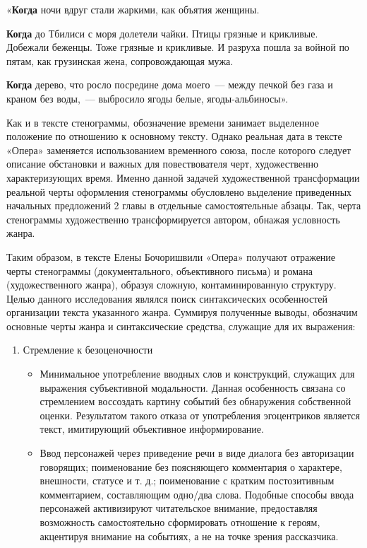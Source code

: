 \documentclass{kursa4}
\begin{document}
{        «\textbf{Когда} ночи вдруг стали жаркими, как объятия женщины.

        \textbf{Когда} до Тбилиси с моря долетели чайки. Птицы грязные и
        крикливые. Добежали беженцы. Тоже грязные и крикливые. И разруха пошла
        за войной по пятам, как грузинская жена, сопровождающая мужа.

        \textbf{Когда} дерево, что росло посредине дома моего~--- между печкой
        без газа и краном без воды,~--- выбросило ягоды белые, ягоды-альбиносы».

        Как и в тексте стенограммы, обозначение времени занимает выделенное
        положение по отношению к основному тексту. Однако реальная дата в
        тексте «Опера» заменяется использованием временного союза, после
        которого следует описание обстановки и важных для повествователя черт,
        художественно характеризующих время. Именно данной задачей
        художественной трансформации реальной черты оформления стенограммы
        обусловлено выделение приведенных начальных предложений 2 главы в
        отдельные самостоятельные абзацы. Так, черта стенограммы художественно
        трансформируется автором, обнажая условность жанра. 

  Таким образом, в тексте Елены Бочоришвили «Опера» получают отражение черты стенограммы (документального, объективного письма) и романа (художественного жанра), образуя сложную, контаминированную структуру. Целью данного исследования являлся поиск синтаксических особенностей организации текста указанного жанра. Суммируя полученные выводы, обозначим основные черты жанра и синтаксические средства, служащие для их выражения:  

  \begin{enumerate}
    \item{Стремление к безоценочности}
    \begin{itemize}
      \item{Минимальное употребление вводных слов и конструкций, служащих для выражения субъективной модальности. Данная особенность связана со стремлением воссоздать картину событий без обнаружения собственной оценки. Результатом такого отказа от употребления эгоцентриков является текст, имитирующий объективное информирование.} 
      \item{Ввод персонажей через приведение речи в виде диалога без авторизации говорящих; поименование без поясняющего комментария о характере, внешности, статусе и т. д.; поименование с кратким постозитивным комментарием, составляющим одно/два слова. Подобные способы ввода персонажей активизируют читательское внимание, предоставляя возможность самостоятельно сформировать отношение к героям, акцентируя внимание на событиях, а не на точке зрения рассказчика.}
    \end{itemize}


\end{enumerate}}
\end{document}
